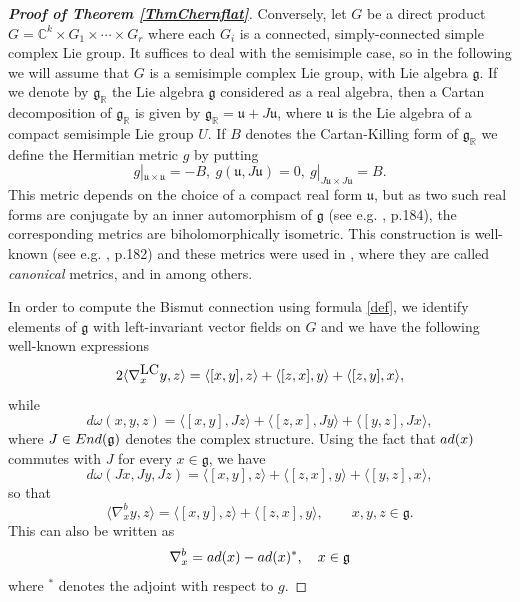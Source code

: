\documentclass{amsart}
\numberwithin{equation}{section}
\theoremstyle{definition}
\renewcommand{\1}{\mathds{1}}
\renewcommand{\gg}{\mathfrak g}
\newcommand{\gu}{\mathfrak u}
\newcommand{\ad}{\rm {ad}}
\renewcommand{\>}{\rightarrow}
\begin{document}
\begin{proof}[{\bf Proof of Theorem \ref{ThmChernflat}}]
Conversely, let $G$ be a direct product $G={\mathbb C}^k \times G_1\times \cdots \times G_r$ where each $G_i$ is a connected, simply-connected simple complex Lie group. It suffices to deal with the semisimple case, so in the following we will assume that $G$ is a semisimple complex Lie group, with Lie algebra ${\mathfrak g}$. If we denote by $\mathfrak g_{\mathbb R}$ the Lie algebra $\mathfrak g$ considered as a real algebra, then a Cartan decomposition of  $\mathfrak g_{\mathbb R}$ is given by ${\mathfrak g_{\mathbb R}} = {\mathfrak u} + J{\mathfrak u}$, where ${\mathfrak u}$ is the Lie algebra of a compact semisimple Lie group $U$. If $B$ denotes the Cartan-Killing form of $\gg_{\mathbb R}$ we define the Hermitian metric $g$  by putting
$$g|_{\gu\times\gu} = -B,\ g(\gu,J\gu)=0,\ g|_{J\gu\times J\gu} = B.$$
This metric depends on the choice of a compact real form $\gu$, but as two such real forms are conjugate by an inner automorphism of $\gg$ (see e.g. \cite{He}, p.184), the corresponding metrics are biholomorphically isometric. This construction is well-known (see e.g. \cite{He}, p.182) and these metrics were used in \cite{LPV}, where they are called {\it canonical} metrics, and in \cite{G} among others. \par
In order to compute the Bismut connection using formula \eqref{def}, we identify elements of $\gg$ with left-invariant vector fields on $G$ and we have the following well-known expressions
$$2 \langle \nabla^{\mbox{\tiny LC}}_xy,z\rangle = \langle[x,y],z\rangle + \langle [z,x],y\rangle + \langle [z,y],x\rangle,$$
while
$$d\omega(x,y,z) = \langle [x,y],Jz\rangle +\langle[z,x],Jy\rangle +\langle [y,z],Jx\rangle, $$
where $J\in {\rm{End}}(\gg)$ denotes the complex structure. Using the fact that ${\rm ad}(x)$ commutes with $J$ for every $x\in \gg$, we have
$$d\omega(Jx,Jy,Jz) = \langle [x,y],z\rangle +\langle[z,x],y\rangle +\langle [y,z],x\rangle, $$
so that
$$\langle \nabla^b_xy,z\rangle = \langle [x,y],z\rangle + \langle [z,x],y\rangle,\qquad x,y,z\in\gg.$$
This can also be written as
$$ \nabla^b_x = \ad(x) - \ad(x)^*,\quad x\in \gg$$
where ${}^*$ denotes the adjoint with respect to $g$. \par


\end{proof}
\end{document}
